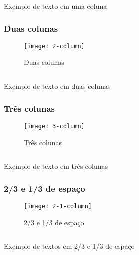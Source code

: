 \begin{code}
    \inputminted[label=1-column.html]{html}{../RS0001/anexos/1-column.html}
    \caption{Exemplo de texto em uma coluna}\label{RS0001:code:exemplo-1-column}
\end{code}


\subsubsection{Duas colunas}

\begin{figure}[!ht]
    \centering
    \texttt{[image: 2-column]}
    \caption{Duas colunas}\label{RS0001:fig:2-column}
\end{figure}

\begin{code}
    \inputminted[label=2-column.html]{html}{../RS0001/anexos/2-column.html}
    \caption{Exemplo de texto em duas colunas}\label{RS0001:code:exemplo-2-column}
\end{code}


\subsubsection{Três colunas}

\begin{figure}[!ht]
    \centering
    \texttt{[image: 3-column]}
    \caption{Três colunas}\label{RS0001:fig:3-column}
\end{figure}

\begin{code}
    \inputminted[label=3-column.html]{html}{../RS0001/anexos/3-column.html}
    \caption{Exemplo de texto em três colunas}\label{RS0001:code:exemplo-3-column}
\end{code}


\subsubsection{2/3 e 1/3 de espaço}

\begin{figure}[!ht]
    \centering
    \texttt{[image: 2-1-column]}
    \caption{2/3 e 1/3 de espaço}\label{RS0001:fig:2-1-column}
\end{figure}

\begin{code}
    \inputminted[label=2-1-column.html]{html}{../RS0001/anexos/2-1-column.html}
    \caption{Exemplo de textos em 2/3 e 1/3 de espaço}\label{RS0001:code:exemplo-2-1-column}
\end{code}


